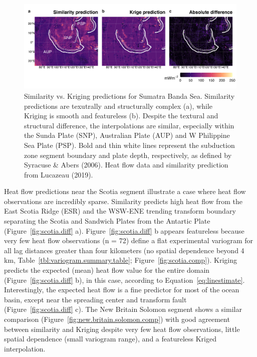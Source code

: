 \documentclass[draft,linenumbers]{agujournal2018}
\begin{document}
\begin{figure}[h]

{\centering \includegraphics[width=0.95\linewidth,]{../figs/diff/custom/Sumatra_Banda_Sea} 

}

\caption{Similarity vs. Kriging predictions for Sumatra Banda Sea. Similarity predictions are texutrally and structurally complex (a), while Kriging is smooth and featureless (b). Despite the textural and structural difference, the interpolations are similar, especially within the Sunda Plate (SNP), Australian Plate (AUP) and W Philippine Sea Plate (PSP). Bold and thin white lines represent the subduction zone segment boundary and plate depth, respectively, as defined by Syracuse \& Abers (2006). Heat flow data and similarity prediction from Lucazeau (2019).}\label{fig:sumatra.banda.sea.diff}
\end{figure}

Heat flow predictions near the Scotia segment illustrate a case where
heat flow observations are incredibly sparse. Similarity predicts high
heat flow from the East Scotia Ridge (ESR) and the WSW-ENE trending
transform boundary separating the Scotia and Sandwich Plates from the
Antartic Plate (Figure~\ref{fig:scotia.diff} a).
Figure~\ref{fig:scotia.diff} b appears featureless because very few heat
flow observations (n = 72) define a flat experimental variogram for all
lag distances greater than four kilometers (no spatial dependence beyond
4 km, Table~\ref{tbl:variogram.summary.table};
Figure~\ref{fig:scotia.comp}). Kriging predicts the expected (mean) heat
flow value for the entire domain (Figure~\ref{fig:scotia.diff} b), in
this case, according to Equation~\ref{eq:linestimate}. Interestingly,
the expected heat flow is a fine predictor for most of the ocean basin,
except near the spreading center and transform fault
(Figure~\ref{fig:scotia.diff} c). The New Britain Solomon segment shows
a similar comparison (Figure~\ref{fig:new.britain.solomon.comp}) with
good agreement between similarity and Kriging despite very few heat flow
observations, little spatial dependence (small variogram range), and a
featureless Kriged interpolation.
\end{document}
